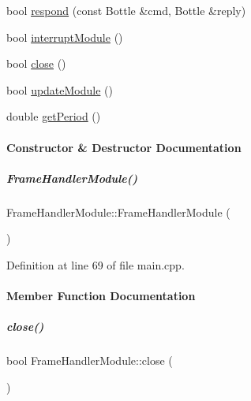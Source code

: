 \begin{DoxyCompactItemize}
bool \hyperlink{group__referenceFrameHandler_ac511e77f51faf5ea84ed5162f3b4aed0}{respond} (const Bottle \&cmd, Bottle \&reply)
\item 
bool \hyperlink{group__referenceFrameHandler_a9a7173f45fe2911804970a595880413e}{interrupt\+Module} ()
\item 
bool \hyperlink{group__referenceFrameHandler_a81ed97b4ba5ca8334f85471fd0f9a58d}{close} ()
\item 
bool \hyperlink{group__referenceFrameHandler_a123d9f8aa941484862ed502f752653f9}{update\+Module} ()
\item 
double \hyperlink{group__referenceFrameHandler_a6f65d363cbf8aa84f0498ea4fd83a77e}{get\+Period} ()
\end{DoxyCompactItemize}


\paragraph{Constructor \& Destructor Documentation}
\mbox{\label{group__referenceFrameHandler_a13f89d223272b8f5e9ad542a8ba94bad}} 
\subparagraph{\texorpdfstring{Frame\+Handler\+Module()}{FrameHandlerModule()}}
{\footnotesize\ttfamily Frame\+Handler\+Module\+::\+Frame\+Handler\+Module (\begin{DoxyParamCaption}{ }\end{DoxyParamCaption})\hspace{0.3cm}{\ttfamily [inline]}}



Definition at line 69 of file main.\+cpp.



\paragraph{Member Function Documentation}
\mbox{\label{group__referenceFrameHandler_a81ed97b4ba5ca8334f85471fd0f9a58d}} 
\subparagraph{\texorpdfstring{close()}{close()}}
{\footnotesize\ttfamily bool Frame\+Handler\+Module\+::close (\begin{DoxyParamCaption}{ }\end{DoxyParamCaption})\hspace{0.3cm}{\ttfamily [inline]}}



